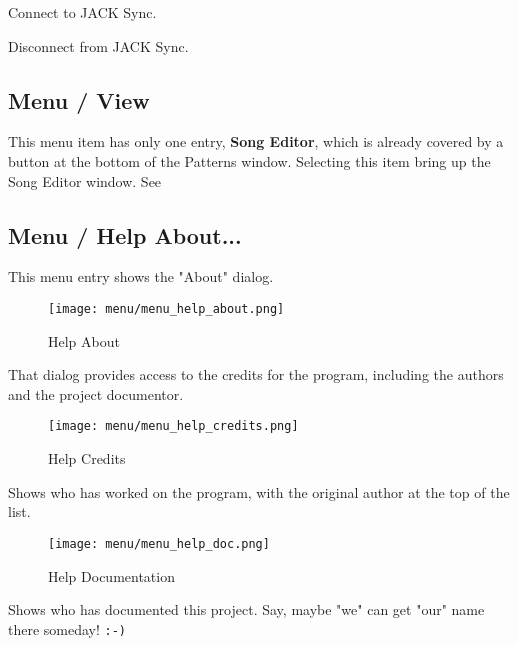   Connect to JACK Sync.

   Disconnect from JACK Sync.

\subsection{Menu / View}
\label{subsec:seq24_menu_view}

   This menu item has only one entry, \textbf{Song Editor}, 
   which is already covered by a button at the bottom of the Patterns
   window.  Selecting this item bring up the Song Editor window.
   See 

\subsection{Menu / Help About...}
\label{subsec:seq24_menu_about}

   This menu entry shows the "About" dialog.

\begin{figure}[H]
   \centering 
   \texttt{[image: menu/menu\_help\_about.png]}
   \caption{Help About}
   \label{fig:seq24_menu_help_about}
\end{figure}

   That dialog provides access to the credits for the program, including the
   authors and the project documentor.

\begin{figure}[H]
   \centering 
   \texttt{[image: menu/menu\_help\_credits.png]}
   \caption{Help Credits}
   \label{fig:seq24_menu_help_credits}
\end{figure}

   Shows who has worked on the program, with the original author at the top
   of the list.

\begin{figure}[H]
   \centering 
   \texttt{[image: menu/menu\_help\_doc.png]}
   \caption{Help Documentation}
   \label{fig:seq24_menu_help_doc}
\end{figure}

   Shows who has documented this project.  Say, maybe "we" can get "our"
   name there someday!  \texttt{:-)}


